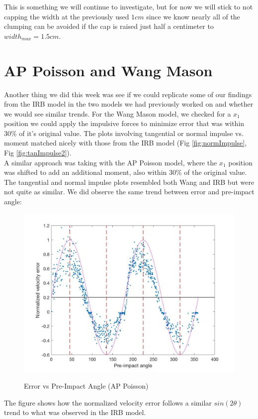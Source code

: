 \documentclass{article}
\begin{document}
\noindent This is something we will continue to investigate, but for now we will stick to not capping the width at the previously used $1cm$ since we know nearly all of the clumping can be avoided if the cap is raised just half a centimeter to $width_{max} = 1.5cm$.

\newpage

\section{AP Poisson and Wang Mason}
Another thing we did this week was see if we could replicate some of our findings from the IRB model in the two models we had previously worked on and whether we would see similar trends. For the Wang Mason model, we checked for a $x_1$ position we could apply the impulsive forces to minimize error that was within 30\% of it's original value. The plots involving tangential or normal impulse vs. moment matched nicely with those from the IRB model (Fig \ref{fig:normImpulse}, Fig \ref{fig:tanImpulse2}). \\

\noindent A similar approach was taking with the AP Poisson model, where the $x_1$ position was shifted to add an additional moment, also within 30\% of the original value. The tangential and normal impulse plots resembled both Wang and IRB but were not quite as similar. We did observe the same trend between error and pre-impact angle:

\begin{figure}[h!]
\centering
\caption{Error vs Pre-Impact Angle (AP Poisson)}
\includegraphics[scale=0.25]{andy1}
\label{fig:andy1}
\end{figure}

\noindent The figure shows how the normalized velocity error follows a similar $sin(2\theta)$ trend to what was observed in the IRB model.
\end{document}
